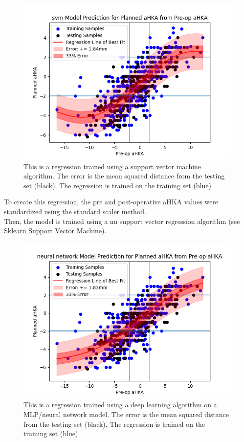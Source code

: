 \documentclass{article}
\begin{document}
\begin{figure}[t]
	\includegraphics[width=\textwidth]{svm_regression.png}
	\caption{This is a regression trained using a support vector machine algorithm.
	The error is the mean squared distance from the testing set (black). 
	The regression is trained on the training set (blue)}
\end{figure}

To create this regression, the pre and post-operative aHKA values were standardized using the standard scaler method.\\
Then, the model is trained using a nu support vector regression algorithm
(see \href{https://scikit-learn.org/stable/modules/generated/sklearn.svm.NuSVR.html#sklearn.svm.NuSVR}{\underline{Sklearn Support Vector Machine}}).

\newpage

\begin{figure}[t]
	\includegraphics[width=\textwidth]{neural_network_regression.png}
	\caption{This is a regression trained using a deep learning algorithm on a MLP/neural network model.
	The error is the mean squared distance from the testing set (black). 
	The regression is trained on the training set (blue)}
\end{figure}
\end{document}
